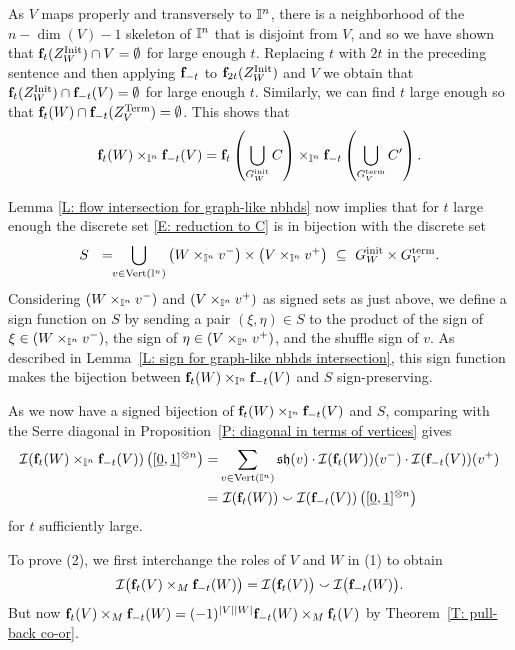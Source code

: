 As $V$ maps properly and transversely to $\mathbb{I}^n$, there is a neighborhood of the $n-\dim(V)-1$ skeleton of $\mathbb{I}^n$ that is disjoint from $V$, and so we have shown that $\mathbf{f}_t(Z_W^{\rm Init}) \cap V = \emptyset$ for large enough $t$.
Replacing $t$ with $2t$ in the preceding sentence and then applying $\mathbf{f}_{-t}$ to $\mathbf{f}_{2t}(Z_W^{\rm Init})$ and $V$ we obtain that $\mathbf{f}_t(Z_W^{\rm Init}) \cap \mathbf{f}_{-t}(V) = \emptyset$ for large enough $t$.
Similarly, we can find $t$ large enough so that $\mathbf{f}_{t}(W) \cap \mathbf{f}_{-t}(Z_V^{\rm Term}) = \emptyset$.
This shows that
\begin{equation}\label{E: reduction to C}
\mathbf{f}_t(W) \times_{\mathbb{I}^n} \mathbf{f}_{-t}(V) = \mathbf{f}_t \left( \bigcup_{G^{\mathrm{init}}_W} C \right) \times_{\mathbb{I}^n} \mathbf{f}_{-t} \left( \bigcup_{G^{\mathrm{term}}_V} C^\prime \right).
\end{equation}

Lemma \ref{L: flow intersection for graph-like nbhds} now implies that for $t$ large enough the discrete set \eqref{E: reduction to C} is in bijection with the discrete set
\begin{equation*}
S\ \ =\!\! \bigcup_{v \in {\rm Vert}(\mathbb{I}^n)} \left(W \times_{\mathbb{I}^n} v^-\right) \times \left(V \times_{\mathbb{I}^n} v^+\right) \ \subseteq\ G^{\mathrm{init}}_W \times G^{\mathrm{term}}_V.
\end{equation*}
Considering $\left(W \times_{\mathbb{I}^n} v^-\right)$ and $\left(V \times_{\mathbb{I}^n} v^+\right)$ as signed sets as just above, we define a sign function on $S$ by sending a pair $(\xi, \eta) \in S$ to the product of the sign of $\xi \in \left(W \times_{\mathbb{I}^n} v^-\right)$, the sign of $\eta \in \left(V \times_{\mathbb{I}^n} v^+\right)$, and the shuffle sign of $v$.
As described in Lemma~\ref{L: sign for graph-like nbhds intersection}, this sign function makes the bijection between $\mathbf{f}_t(W) \times_{\mathbb{I}^n} \mathbf{f}_{-t}(V)$ and $S$ sign-preserving.

As we now have a signed bijection of $\mathbf{f}_t(W) \times_{\mathbb{I}^n} \mathbf{f}_{-t}(V)$ and $S$, comparing with the Serre diagonal in Proposition~\ref{P: diagonal in terms of vertices} gives
\begin{align*}
\mathcal{I} (\mathbf{f}_t(W) \times_{\mathbb{I}^n} \mathbf{f}_{-t}(V)) \left([\underline{0}, \underline{1}]^{\otimes n}\right) = &
\sum_{v \in {\rm Vert}(\mathbb{I}^n)} \mathfrak{sh}(v) \cdot \mathcal{I}(\mathbf{f}_t(W))(v^-) \cdot \mathcal{I}(\mathbf{f}_{-t}(V))(v^+) \\ = & \
\mathcal{I}(\mathbf{f}_t(W)) \smallsmile \mathcal{I}(\mathbf{f}_{-t}(V)) \left([\underline{0}, \underline{1}]^{\otimes n}\right)
\end{align*}
for $t$ sufficiently large.

To prove (2), we first interchange the roles of $V$ and $W$ in (1) to obtain
\begin{equation*}
\mathcal{I} \big( \mathbf{f}_t(V) \times_M \mathbf{f}_{-t}(W) \big) =
\mathcal{I} \big( \mathbf{f}_t(V) \big) \smallsmile \mathcal{I} \big( \mathbf{f}_{-t}(W) \big).
\end{equation*}
But now $\mathbf{f}_t(V) \times_M \mathbf{f}_{-t}(W)=(-1)^{|V||W|}\mathbf{f}_{-t}(W) \times_M \mathbf{f}_{t}(V)$ by Theorem~\ref{T: pull-back co-or}.
\hfill\qedsymbol
